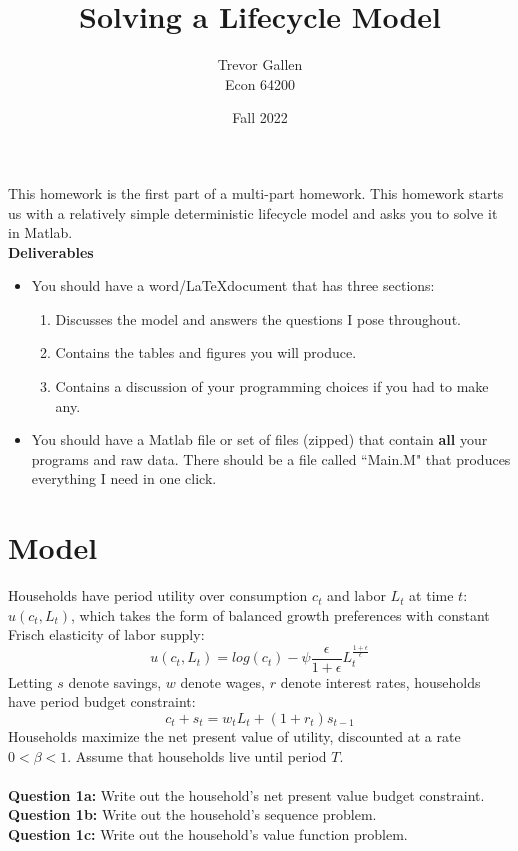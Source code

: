\documentclass[11pt]{article}
\title{Solving a Lifecycle Model}
\author{ Trevor Gallen \\ Econ 64200 }
\date{Fall 2022}
\begin{document}


\maketitle

This homework is the first part of a multi-part homework.  This homework starts us with a relatively simple deterministic lifecycle model and asks you to solve it in Matlab.\\

\textbf{Deliverables}
\begin{itemize}
\item You should have a word/\LaTeX document that has three sections: 
\begin{enumerate}
\item Discusses the model and answers the questions I pose throughout.
\item Contains the tables and figures you will produce.
\item Contains a discussion of your programming choices if you had to make any.
\end{enumerate}
\item You should have a Matlab file or set of files (zipped) that contain \textbf{all} your programs and raw data.  There should be a file called ``Main.M" that produces everything I need in one click.
\end{itemize}


\section{Model}
Households have period utility over consumption $c_t$ and labor $L_t$ at time $t$: $u(c_t,L_t)$, which takes the form of balanced growth preferences with constant Frisch elasticity of labor supply:
$$u(c_t,L_t)=log(c_t)-\psi \frac{\epsilon}{1+\epsilon}L_t^\frac{1+\epsilon}{\epsilon}$$
Letting $s$ denote savings, $w$ denote wages, $r$ denote interest rates, households have period budget constraint:
$$c_t+s_t=w_tL_t+(1+r_t)s_{t-1}$$
Households maximize the net present value of utility, discounted at a rate $0<\beta<1$. Assume that households live until period $T$.\\
\ \\
\textbf{Question 1a:} Write out the household's net present value budget constraint.\\
\textbf{Question 1b:} Write out the household's sequence problem.\\
\textbf{Question 1c:} Write out the household's value function problem.\\
\end{document}

